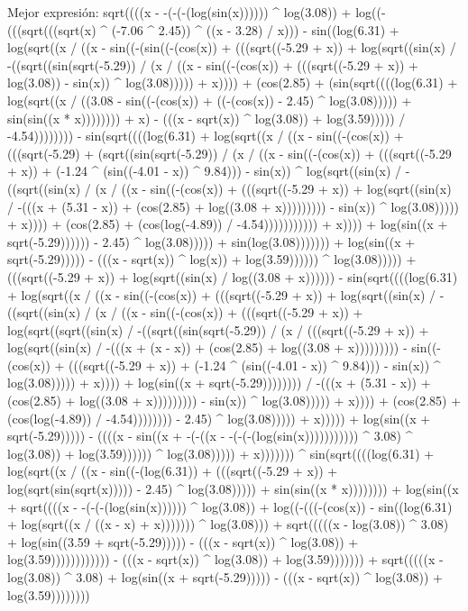 Mejor expresión: sqrt((((x - -(-(-(log(sin(x)))))) ^ log(3.08)) + log((-(((sqrt(((sqrt(x) ^ (-7.06 ^ 2.45)) ^ ((x - 3.28) / x))) - sin((log(6.31) + log(sqrt((x / ((x - sin((-(sin((-(cos(x)) + (((sqrt((-5.29 + x)) + log(sqrt((sin(x) / -((sqrt((sin(sqrt(-5.29)) / (x / ((x - sin((-(cos(x)) + (((sqrt((-5.29 + x)) + log(3.08)) - sin(x)) ^ log(3.08))))) + x)))) + (cos(2.85) + (sin(sqrt((((log(6.31) + log(sqrt((x / ((3.08 - sin((-(cos(x)) + ((-(cos(x)) - 2.45) ^ log(3.08))))) + sin(sin((x * x)))))))) + x) - (((x - sqrt(x)) ^ log(3.08)) + log(3.59))))) / -4.54)))))))) - sin(sqrt((((log(6.31) + log(sqrt((x / ((x - sin((-(cos(x)) + (((sqrt(-5.29) + (sqrt((sin(sqrt(-5.29)) / (x / ((x - sin((-(cos(x)) + (((sqrt((-5.29 + x)) + (-1.24 ^ (sin((-4.01 - x)) ^ 9.84))) - sin(x)) ^ log(sqrt((sin(x) / -((sqrt((sin(x) / (x / ((x - sin((-(cos(x)) + (((sqrt((-5.29 + x)) + log(sqrt((sin(x) / -(((x + (5.31 - x)) + (cos(2.85) + log((3.08 + x))))))))) - sin(x)) ^ log(3.08))))) + x)))) + (cos(2.85) + (cos(log(-4.89)) / -4.54))))))))))) + x)))) + log(sin((x + sqrt(-5.29)))))) - 2.45) ^ log(3.08))))) + sin(log(3.08))))))) + log(sin((x + sqrt(-5.29))))) - (((x - sqrt(x)) ^ log(x)) + log(3.59)))))) ^ log(3.08))))) + (((sqrt((-5.29 + x)) + log(sqrt((sin(x) / log((3.08 + x)))))) - sin(sqrt((((log(6.31) + log(sqrt((x / ((x - sin((-(cos(x)) + (((sqrt((-5.29 + x)) + log(sqrt((sin(x) / -((sqrt((sin(x) / (x / ((x - sin((-(cos(x)) + (((sqrt((-5.29 + x)) + log(sqrt((sqrt((sin(x) / -((sqrt((sin(sqrt(-5.29)) / (x / (((sqrt((-5.29 + x)) + log(sqrt((sin(x) / -(((x + (x - x)) + (cos(2.85) + log((3.08 + x))))))))) - sin((-(cos(x)) + (((sqrt((-5.29 + x)) + (-1.24 ^ (sin((-4.01 - x)) ^ 9.84))) - sin(x)) ^ log(3.08))))) + x)))) + log(sin((x + sqrt(-5.29)))))))) / -(((x + (5.31 - x)) + (cos(2.85) + log((3.08 + x))))))))) - sin(x)) ^ log(3.08))))) + x)))) + (cos(2.85) + (cos(log(-4.89)) / -4.54)))))))) - 2.45) ^ log(3.08))))) + x))))) + log(sin((x + sqrt(-5.29))))) - ((((x - sin((x + -(-((x - -(-(-(log(sin(x))))))))))) ^ 3.08) ^ log(3.08)) + log(3.59)))))) ^ log(3.08))))) + x))))))) ^ sin(sqrt((((log(6.31) + log(sqrt((x / ((x - sin((-(log(6.31)) + (((sqrt((-5.29 + x)) + log(sqrt(sin(sqrt(x))))) - 2.45) ^ log(3.08))))) + sin(sin((x * x)))))))) + log(sin((x + sqrt((((x - -(-(-(log(sin(x)))))) ^ log(3.08)) + log((-(((-(cos(x)) - sin((log(6.31) + log(sqrt((x / ((x - x) + x))))))) ^ log(3.08))) + sqrt(((((x - log(3.08)) ^ 3.08) + log(sin((3.59 + sqrt(-5.29))))) - (((x - sqrt(x)) ^ log(3.08)) + log(3.59)))))))))))) - (((x - sqrt(x)) ^ log(3.08)) + log(3.59))))))) + sqrt(((((x - log(3.08)) ^ 3.08) + log(sin((x + sqrt(-5.29))))) - (((x - sqrt(x)) ^ log(3.08)) + log(3.59))))))))
